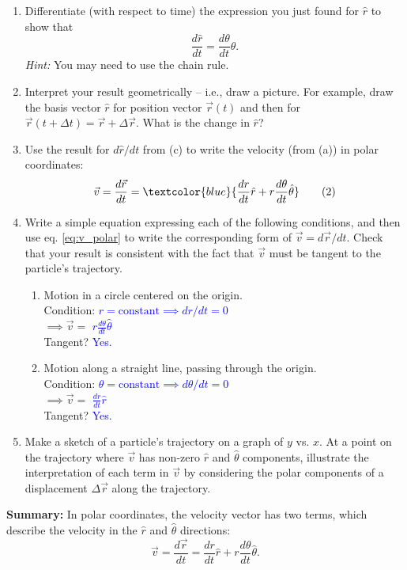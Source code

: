 \documentclass[11pt, letterpaper, openany]{book}
\newenvironment{exercise}[1][Exercise]{%
  \tcolorbox[blanker, breakable, left=1em,
    before skip=1em, after skip=1em,
    borderline west={3pt}{0pt}{PhysNavy},
    colback=PhysCream,
    before upper={\textcolor{PhysNavy}{\sffamily\bfseries #1:}\space}
  ]%
}{%
  \endtcolorbox%
}
\begin{document}
\begin{exercise}[Exercise 3]
\begin{enumerate}[label=(\alph*)]
    \item Differentiate (with respect to time) the expression you just found for $\hat{r}$ to show that
    \[ \frac{d\hat{r}}{dt} = \frac{d\theta}{dt}\hat{\theta}. \]
    \textit{Hint:} You may need to use the chain rule.
    \item Interpret your result geometrically -- i.e., draw a picture. For example, draw the basis vector $\hat{r}$ for position vector $\vec{r}(t)$ and then for $\vec{r}(t+\Delta t) = \vec{r} + \Delta\vec{r}$. What is the change in $\hat{r}$?
    \item Use the result for $d\hat{r}/dt$ from (c) to write the velocity (from (a)) in polar coordinates:
    \[ \vec{v} = \frac{d\vec{r}}{dt} = \textcolor{blue}{\frac{dr}{dt}\hat{r} + r\frac{d\theta}{dt}\hat{\theta}} \label{eq:v_polar} \tag{2} \]
    \item Write a simple equation expressing each of the following conditions, and then use eq. \ref{eq:v_polar} to write the corresponding form of $\vec{v} = d\vec{r}/dt$. Check that your result is consistent with the fact that $\vec{v}$ must be tangent to the particle's trajectory.
    \begin{enumerate}[label=(\roman*)]
        \item Motion in a circle centered on the origin. \\
        Condition: \textcolor{blue}{$r = \text{constant} \implies dr/dt = 0$} \\
        $\implies \vec{v} =$ \textcolor{blue}{$r\frac{d\theta}{dt}\hat{\theta}$} \\
        Tangent? \textcolor{blue}{Yes.}
        \item Motion along a straight line, passing through the origin. \\
        Condition: \textcolor{blue}{$\theta = \text{constant} \implies d\theta/dt = 0$} \\
        $\implies \vec{v} =$ \textcolor{blue}{$\frac{dr}{dt}\hat{r}$} \\
        Tangent? \textcolor{blue}{Yes.}
    \end{enumerate}
    \item Make a sketch of a particle's trajectory on a graph of $y$ vs. $x$. At a point on the trajectory where $\vec{v}$ has non-zero $\hat{r}$ and $\hat{\theta}$ components, illustrate the interpretation of each term in $\vec{v}$ by considering the polar components of a displacement $\Delta\vec{r}$ along the trajectory.
\end{enumerate}

\textbf{Summary:} In polar coordinates, the velocity vector has two terms, which describe the velocity in the $\hat{r}$ and $\hat{\theta}$ directions:
\[ \vec{v} = \frac{d\vec{r}}{dt} = \frac{dr}{dt}\hat{r} + r\frac{d\theta}{dt}\hat{\theta}. \]
\end{exercise}
\end{document}
